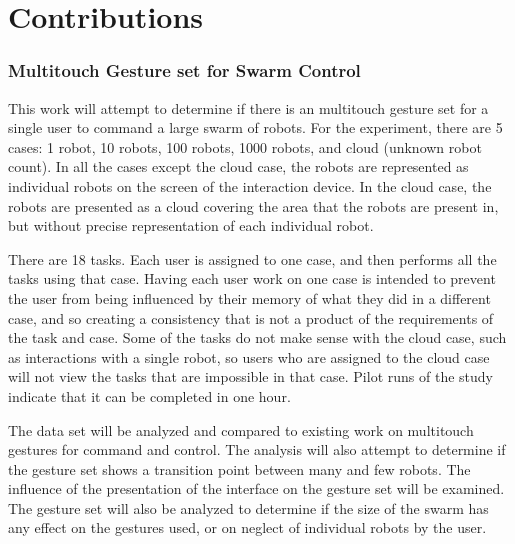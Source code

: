 \chapter{Contributions} \label{chapter:Contributions}

\subsection{Multitouch Gesture set for Swarm Control} \label{section:Multitouch_Gesture_set_for_Swarm_Control}
This work will attempt to determine if there is an multitouch gesture set for a single user to command a large swarm of robots.
For the experiment, there are 5 cases: 1 robot, 10 robots, 100 robots, 1000 robots, and cloud (unknown robot count). 
In all the cases except the cloud case, the robots are represented as individual robots on the screen of the interaction device. 
In the cloud case, the robots are presented as a cloud covering the area that the robots are present in, but without precise representation of each individual robot. 

There are 18 tasks. 
Each user is assigned to one case, and then performs all the tasks using that case. 
Having each user work on one case is intended to prevent the user from being influenced by their memory of what they did in a different case, and so creating a consistency that is not a product of the requirements of the task and case. 
Some of the tasks do not make sense with the cloud case, such as interactions with a single robot, so users who are assigned to the cloud case will not view the tasks that are impossible in that case.
Pilot runs of the study indicate that it can be completed in one hour. 

The data set will be analyzed and compared to existing work on multitouch gestures for command and control. 
The analysis will also attempt to determine if the gesture set shows a transition point between many and few robots. 
The influence of the presentation of the interface on the gesture set will be examined. 
The gesture set will also be analyzed to determine if the size of the swarm has any effect on the gestures used, or on neglect of individual robots by the user. 

